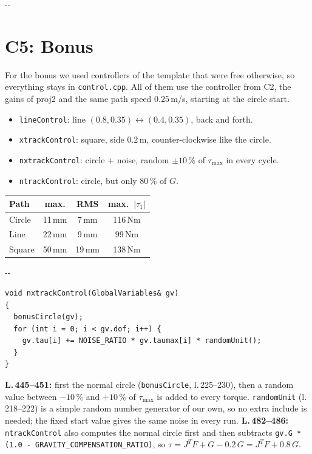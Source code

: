 \documentclass[10pt,a4paper]{article}
\makeatletter
\newcommand{\secneed}[1]{\par\penalty\@M\begingroup\setlength{\dimen@}{#1}\dimen@ii\pagegoal
  \advance\dimen@ii-\pagetotal\ifdim\dimen@>\dimen@ii\ifdim\dimen@ii>\z@\vfil\fi\penalty-\@M\fi\endgroup}
\let\oldsection\section
\renewcommand{\section}{\secneed{9\baselineskip}\oldsection}
\newcommand{\code}[1]{\texttt{#1}}
\makeatother
\begin{document}
\section{C5: Bonus}

For the bonus we used controllers of the template that were free otherwise, so everything stays in \code{control.cpp}.
All of them use the controller from C2, the gains of proj2 and the same path speed $0.25$\,m/s, starting at the circle
start.

\begin{minipage}[c]{0.5\textwidth}
\begin{itemize}
  \item \code{lineControl}: line $(0.8, 0.35) \leftrightarrow (0.4, 0.35)$, back and forth.
  \item \code{xtrackControl}: square, side $0.2$\,m, counter-clockwise like the circle.
  \item \code{nxtrackControl}: circle + noise, random $\pm 10\,\%$ of $\tau_{\max}$ in every cycle.
  \item \code{ntrackControl}: circle, but only $80\,\%$ of $G$.
\end{itemize}
\end{minipage}\hfill
\begin{minipage}[c]{0.47\textwidth}
\centering
{\small
\begin{tabular}{lccc}
  \toprule
  Path & max. & RMS & max.\ $|\tau_1|$ \\
  \midrule
  Circle & 11\,mm & 7\,mm & 116\,Nm \\
  Line & 22\,mm & 9\,mm & 99\,Nm \\
  Square & 50\,mm & 19\,mm & 138\,Nm \\
  \bottomrule
\end{tabular}
}
\end{minipage}

\secneed{8\baselineskip}
\begin{lstlisting}[firstnumber=445]
void nxtrackControl(GlobalVariables& gv)
{
  bonusCircle(gv);
  for (int i = 0; i < gv.dof; i++) {
    gv.tau[i] += NOISE_RATIO * gv.taumax[i] * randomUnit();
  }
}
\end{lstlisting}
\textbf{L.\,445--451:} first the normal circle (\code{bonusCircle}, l.\,225--230), then a random value between $-10\,\%$
and $+10\,\%$ of $\tau_{\max}$ is added to every torque. \code{randomUnit} (l.\,218--222) is a simple random number
generator of our own, so no extra include is needed; the fixed start value gives the same noise in every run.
\textbf{L.\,482--486:} \code{ntrackControl} also computes the normal circle first and then subtracts
\code{gv.G * (1.0 - GRAVITY\_COMPENSATION\_RATIO)}, so $\tau = J^T F + G - 0.2\,G = J^T F + 0.8\,G$.
\end{document}
